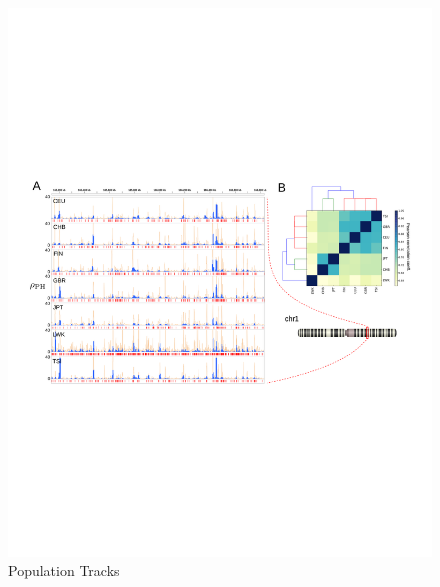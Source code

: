 \begin{figure}
\centering
\includegraphics[width=\textwidth]{./fig/human_rates_Fig3.pdf}
\caption{Population Tracks}
\label{human_rates:fig:fig2}
\end{figure}